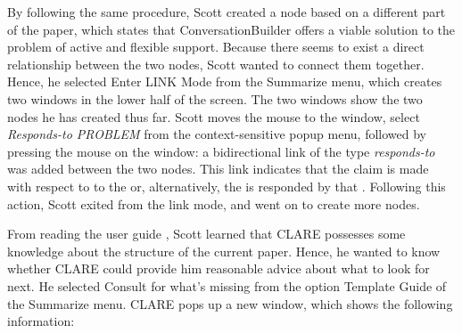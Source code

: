 By following the same procedure, Scott created a  node
based on a different part of the paper, which states that
ConversationBuilder offers a viable solution to the problem of active and
flexible support. Because there seems to exist a direct relationship
between the two nodes, Scott wanted to connect them together. Hence, he
selected {\sf Enter LINK Mode\/} from the {\sf Summarize\/} menu, which
creates two windows in the lower half of the screen. The two windows show
the two nodes he has created thus far.  Scott moves the mouse to the
 window, select {\it Responds-to PROBLEM} from the
context-sensitive popup menu, followed by pressing the mouse on the
 window: a bidirectional link of the type {\it
responds-to\/} was added between the two nodes. This link indicates that
the claim is made with respect to to the  or,
alternatively, the  is responded by that . Following this action, Scott exited from the link mode, and went
on to create more nodes.

From reading the user guide \cite{csdl-93-15}, Scott learned that CLARE
possesses some knowledge about the structure of the current paper. Hence,
he wanted to know whether CLARE could provide him reasonable advice about
what to look for next. He selected {\sf Consult for what's missing} from
the option {\sf Template Guide\/} of the {\sf Summarize\/} menu. CLARE pops
up a new window, which shows the following information:

